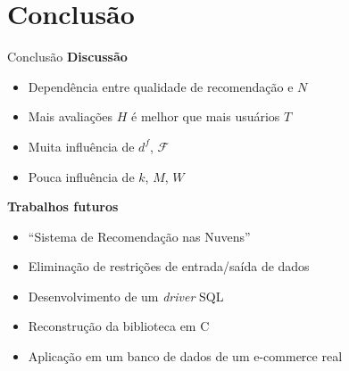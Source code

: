 \section[Conclusão]{Conclusão}
\begin{frame}{Conclusão}
\textbf{Discussão}
\begin{itemize}
	\item Dependência entre qualidade de recomendação e $N$
	\item Mais avaliações $H$ é melhor que mais usuários $T$
	\item Muita influência de $d^f$, $\mathcal{F}$
	\item Pouca influência de $k$, $M$, $W$
\end{itemize}
\vspace{.5cm}
\textbf{Trabalhos futuros}
\begin{itemize}
	\item ``Sistema de Recomendação nas Nuvens''
	\item Eliminação de restrições de entrada/saída de dados
	\item Desenvolvimento de um \textit{driver} SQL 
	\item Reconstrução da biblioteca em C
	\item Aplicação em um banco de dados de um e-commerce real
\end{itemize}
\end{frame}